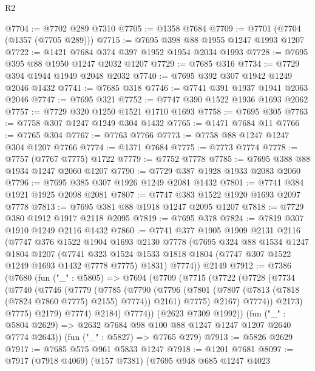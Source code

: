 \begin{lexlean}{R2}
\begin{coremodule}
@7704 := @7702 @289 @7310
@7705 := @1358 @7684
@7709 := @7701 (@7704 (@1357 (@7705 @289)))
@7715 := @7695 @398 @88 @1955 @1247 @1993 @1207
@7722 := @1421 @7684 @374 @397 @1952 @1954 @2034 @1993
@7728 := @7695 @395 @88 @1950 @1247 @2032 @1207
@7729 := @7685 @316
@7734 := @7729 @394 @1944 @1949 @2048 @2032
@7740 := @7695 @392 @307 @1942 @1249 @2046 @1432
@7741 := @7685 @318
@7746 := @7741 @391 @1937 @1941 @2063 @2046
@7747 := @7695 @321
@7752 := @7747 @390 @1522 @1936 @1693 @2062
@7757 := @7729 @320 @1250 @1521 @1710 @1693
@7758 := @7695 @305
@7763 := @7758 @307 @1247 @1249 @304 @1432
@7765 := @1471 @7684 @11
@7766 := @7765 @304
@7767 := @7763 @7766
@7773 := @7758 @88 @1247 @1247 @304 @1207 @7766
@7774 := @1371 @7684
@7775 := @7773 @7774
@7778 := @7757 (@7767 @7775) @1722
@7779 := @7752 @7778
@7785 := @7695 @388 @88 @1934 @1247 @2060 @1207
@7790 := @7729 @387 @1928 @1933 @2083 @2060
@7796 := @7695 @385 @307 @1926 @1249 @2081 @1432
@7801 := @7741 @384 @1921 @1925 @2098 @2081
@7807 := @7747 @383 @1522 @1920 @1693 @2097 @7778
@7813 := @7695 @381 @88 @1918 @1247 @2095 @1207
@7818 := @7729 @380 @1912 @1917 @2118 @2095
@7819 := @7695 @378
@7824 := @7819 @307 @1910 @1249 @2116 @1432
@7860 := @7741
    @377
    @1905
    @1909
    @2131
    @2116
    (@7747
      @376
      @1522
      @1904
      @1693
      @2130
      @7778
      (@7695
        @324
        @88
        @1534
        @1247
        @1804
        @1207
        (@7741 @323 @1524 @1533 @1818 @1804 (@7747 @307 @1522 @1249 @1693 @1432 @7778 @7775) @1831)
        @7774))
    @2149
@7912 := @7386
    (@7680
      (fun ("_" : @5805) =>
      @7694
        (@7709
          (@7715
            (@7722
              (@7728
                (@7734
                  (@7740
                    (@7746
                      (@7779
                        (@7785
                          (@7790
                            (@7796
                              (@7801 (@7807 (@7813 (@7818 (@7824 @7860 @7775) @2155) @7774)) @2161)
                              @7775)
                            @2167)
                          @7774))
                      @2173)
                    @7775)
                  @2179)
                @7774)
              @2184)
            @7774))
        (@2623 @7309 @1992))
      (fun ("_" : @5804 @2629) => @2632 @7684 @98 @100 @88 @1247 @1247 @1207 @2640 @7774 @2643))
    (fun ("_" : @5827) => @7765 @279)
@7913 := @5826 @2629
@7917 := @7685 @575 @961 @5833 @1247
@7918 := @1201 @7681
@8097 := @7917
    (@7918 @4069)
    (@157 @7381)
    (@7695
      @948
      @685
      @1247
      @4023

\end{coremodule}
\end{lexlean}
